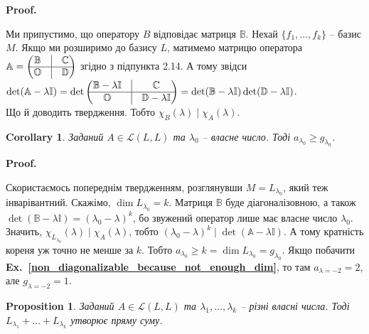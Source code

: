 \documentclass[a4paper, 10pt]{article}
\makeatletter
\theoremstyle{theoremdd}
\newtheorem{proposition}[theorem]{Proposition}
\newtheorem{corollary}[theorem]{Corollary}
\newcommand\exref[1]{\textbf{Ex.~\ref{#1}}}
\renewenvironment{proof}[1][Proof.\\]{\par
\pushQED{\hfill \qed}%
\normalfont \topsep6\p@\@plus6\p@\relax
\trivlist
\item\relax
{\bfseries
#1\@addpunct{.}}\hspace\labelsep\ignorespaces
}{%
\popQED\endtrivlist\@endpefalse
}
\makeatother
\begin{document}
\begin{proof}
Ми припустимо, що оператору $B$ відповідає матриця $\mathbb{B}$. Нехай $\{f_1,\dots,f_k\}$ -- базис $M$. Якщо ми розширимо до базису $L$, матимемо матрицю оператора $\mathbb{A} = \begin{pmatrix}
\mathbb{B} & \vline & \mathbb{C} \\
\hline
\mathbb{O} & \vline & \mathbb{D}
\end{pmatrix}$ згідно з підпункта 2.14. А тому звідси\\
$\det (\mathbb{A} - \lambda \mathbb{I}) = \det \begin{pmatrix}
\mathbb{B}- \lambda \mathbb{I} & \vline & \mathbb{C} \\
\hline
\mathbb{O} & \vline & \mathbb{D}- \lambda \mathbb{I}
\end{pmatrix} = \det(\mathbb{B}-\lambda \mathbb{I}) \det (\mathbb{D} - \lambda \mathbb{I})$.\\
Що й доводить твердження. Тобто $\chi_B(\lambda) \mid \chi_A(\lambda)$.
\end{proof}

\begin{corollary}
Заданий $A \in \mathcal{L}(L,L)$ та $\lambda_0$ -- власне число. Тоді $a_{\lambda_0} \geq g_{\lambda_0}$.
\end{corollary}

\begin{proof}
Скористаємось попереднім твердженням, розглянувши $M = L_{\lambda_0}$, який теж інварівантний. Скажімо, $\dim L_{\lambda_0} = k$. Матриця $\mathbb{B}$ буде діагоналізовною, а також $\det (\mathbb{B}-\lambda \mathbb{I}) = (\lambda_0-\lambda)^k$, бо звужений оператор лише має власне число $\lambda_0$. Значить, $\chi_{L_{\lambda_0}}(\lambda) \mid \chi_A(\lambda)$, тобто $(\lambda_0-\lambda)^k \mid \det(\mathbb{A}-\lambda \mathbb{I})$. А тому кратність кореня уж точно не менше за $k$. Тобто $a_{\lambda_0} \geq k = \dim L_{\lambda_0} = g_{\lambda_0}$.
\end{proof}
\noindent
Якщо побачити \exref{non_diagonalizable_because_not_enough_dim}, то там $a_{\lambda=-2} = 2$, але $g_{\lambda = -2} = 1$.

\begin{proposition}
Заданий $A \in \mathcal{L}(L,L)$ та $\lambda_1,\dots,\lambda_k$ -- різні власні числа. Тоді $L_{\lambda_1} + \dots + L_{\lambda_k}$ утворює пряму суму.
\end{proposition}
\end{document}
